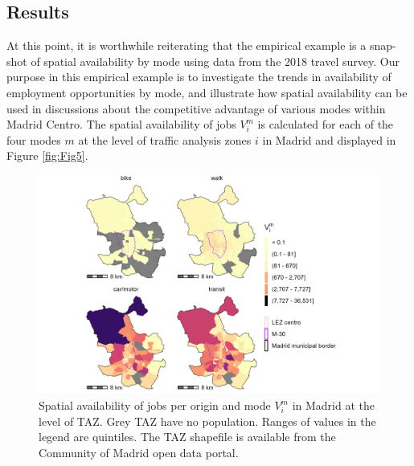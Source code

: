\documentclass[10pt,letterpaper]{article}
\begin{document}
\hypertarget{results}{%
\subsection{Results}\label{results}}

At this point, it is worthwhile reiterating that the empirical example
is a snap-shot of spatial availability by mode using data from the 2018
travel survey. Our purpose in this empirical example is to investigate
the trends in availability of employment opportunities by mode, and
illustrate how spatial availability can be used in discussions about the
competitive advantage of various modes within Madrid Centro. The spatial
availability of jobs \(V_i^m\) is calculated for each of the four modes
\(m\) at the level of traffic analysis zones \(i\) in Madrid and
displayed in Figure \ref{fig:Fig5}.

\begin{figure}

{\centering \includegraphics[width=0.85\linewidth]{images/Fig5} 

}

\caption{\label{fig:Fig5} Spatial availability of jobs per origin and mode $V_i^m$ in Madrid at the level of TAZ. Grey TAZ have no population. Ranges of values in the legend are quintiles. The TAZ shapefile is available from the Community of Madrid open data portal.}\label{fig:SA-m-plot}
\end{figure}
\end{document}
